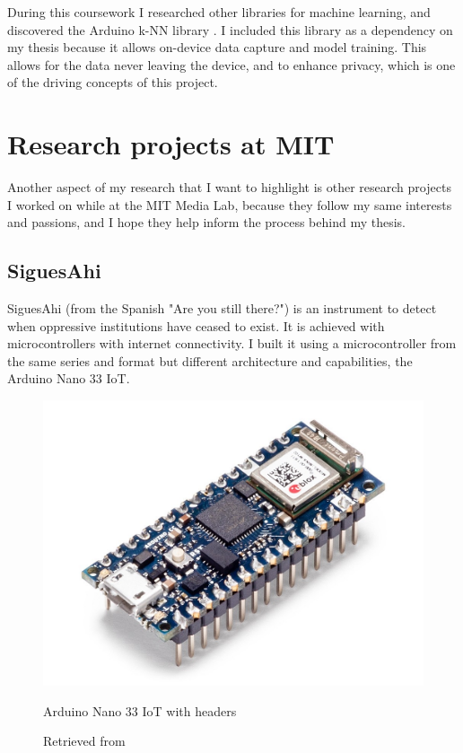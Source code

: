 During this coursework I researched other libraries for machine learning, and discovered the Arduino \acrshort{k-NN} library \cite{repository-arduino-knn}. I included this library as a dependency on my thesis because it allows on-device data capture and model training. This allows for the data never leaving the device, and to enhance privacy, which is one of the driving concepts of this project.

\section{Research projects at MIT}

Another aspect of my research that I want to highlight is other research projects I worked on while at the MIT Media Lab, because they follow my same interests and passions, and I hope they help inform the process behind my thesis.

\subsection{SiguesAhi}

SiguesAhi \cite{website-library-siguesahi} (from the Spanish "Are you still there?") is an instrument to detect when oppressive institutions have ceased to exist. It is achieved with microcontrollers with internet connectivity.  I built it using a microcontroller from the same series and format but different architecture and capabilities, the Arduino Nano 33 IoT.

\begin{figure}[ht]
  \centering
  \includegraphics[width=0.75\linewidth,height=0.20\textheight,keepaspectratio]{images/arduino-nano-33-iot-with-headers.jpg}
  \caption{Arduino Nano 33 IoT with headers}
  \caption*{Retrieved from \cite{website-arduino-nano-33-iot-with-headers}}
  \label{}
\end{figure}

